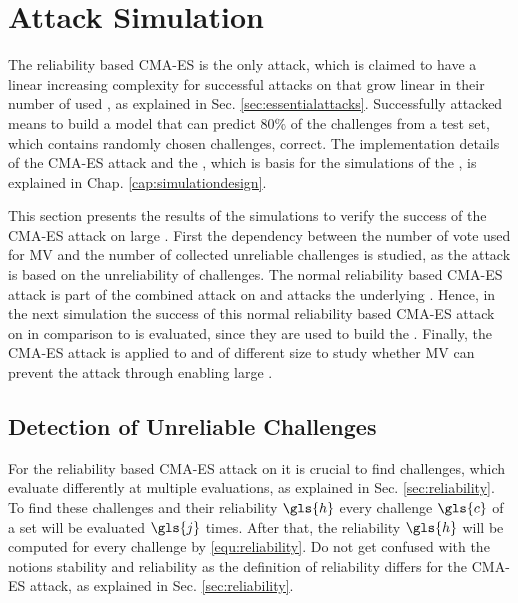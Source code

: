 \chapter{Attack Simulation}
\label{cap:attacksimulations}


The reliability based \ac{CMA-ES} is the only attack, which is claimed to have a linear increasing complexity for successful attacks on \xpufs that grow linear in their number of used \apufs, as explained in Sec. \ref{sec:essentialattacks}.
Successfully attacked means to build a model that can predict $80 \%$ of the challenges from a test set, which contains randomly chosen challenges, correct.
The implementation details of the \ac{CMA-ES} attack and the \apuf, which is basis for the simulations of the \mpuf, is explained in Chap. \ref{cap:simulationdesign}.

This section presents the results of the simulations to verify the success of the \ac{CMA-ES} attack on large \xpufs.
First the dependency between the number of vote used for \ac{MV} and the number of collected unreliable challenges is studied, as the attack is based on the unreliability of challenges.
The normal reliability based \ac{CMA-ES} attack is part of the combined attack on \mxpufs and attacks the underlying \mpufs.
Hence, in the next simulation the success of this normal reliability based \ac{CMA-ES} attack on \mpufs in comparison to \apufs is evaluated, since they are used to build the \mxpuf.
Finally, the \ac{CMA-ES} attack is applied to \xpufs and \mxpufs of different size to study whether \ac{MV} can prevent the attack through enabling large \mxpufs. 


\section{Detection of Unreliable Challenges}
\label{sec:detectionofunreliablechallenges}

For the reliability based \ac{CMA-ES} attack on \apufs it is crucial to find challenges, which evaluate differently at multiple evaluations, as explained in Sec. \ref{sec:reliability}.
To find these challenges and their reliability $\gls{h}$ every challenge $\gls{c}$ of a set will be evaluated $\gls{j}$ times.
After that, the reliability $\gls{h}$ will be computed for every challenge by \ref{equ:reliability}.
Do not get confused with the notions stability and reliability as the definition of reliability differs for the \ac{CMA-ES} attack, as explained in Sec. \ref{sec:reliability}.

